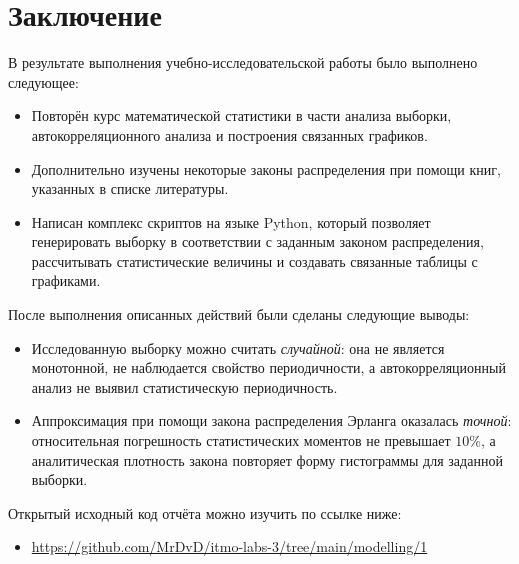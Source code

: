\section{Заключение}

В результате выполнения учебно-исследовательской работы было выполнено следующее:

\begin{itemize}
    \item Повторён курс математической статистики в части анализа выборки, автокорреляционного анализа и построения связанных графиков.
    \item Дополнительно изучены некоторые законы распределения при помощи книг, указанных в списке литературы.
    \item Написан комплекс скриптов на языке Python, который позволяет генерировать выборку в соответствии с заданным законом распределения, рассчитывать статистические величины и создавать связанные таблицы с графиками.
\end{itemize}

После выполнения описанных действий были сделаны следующие выводы:
\begin{itemize}
    \item Исследованную выборку можно считать \textit{случайной}: она не является монотонной, не наблюдается свойство периодичности, а автокорреляционный анализ не выявил статистическую периодичность.
    \item Аппроксимация при помощи закона распределения Эрланга оказалась \textit{точной}: относительная погрешность статистических моментов не превышает $10\%$, а аналитическая плотность закона повторяет форму гистограммы для заданной выборки.  
\end{itemize}

Открытый исходный код отчёта можно изучить по ссылке ниже:
\begin{itemize}
    \item \url{https://github.com/MrDvD/itmo-labs-3/tree/main/modelling/1}
\end{itemize}

